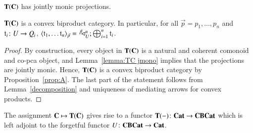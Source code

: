\begin{lemma}\label{lemma:TC jmono}
$\mathbf{T}(\mathbf{C})$ has jointly monic projections.
\end{lemma}
%
%
%

\begin{theorem}\label{thm:TCconvexbiproductcategory}
$\mathbf{T}(\mathbf{C})$ is a convex biproduct category. In particular, for all $\vec{p}=p_1,\dots ,p_n$ and $\mathfrak{t}_i\colon U \to Q_i$, $\langle \mathfrak{t}_1, \dots \mathfrak{t}_n\rangle_{\vec{p}} = ^{\;\;\vec{p}}\!\!\! \lhd_{U}^{n}; \bigoplus_{i=1}^n \mathfrak{t}_i$.
\end{theorem}
\begin{proof}
    By construction, every object in $\mathbf{T}(\mathbf{C})$ is a natural and coherent comonoid and co-pca object, and Lemma~\ref{lemma:TC jmono} implies that the projections are jointly monic. Hence, $\mathbf{T}(\mathbf{C})$ is a convex biproduct category by Proposition~\ref{prop:A}. The last part of the statement follows from Lemma~\ref{decomposition} and uniqueness of mediating arrows for convex products.
\end{proof}
The assignment $\mathbf{C} \mapsto \mathbf{T}(\mathbf{C})$ gives rise to a functor $\mathbf{T}(-)\colon \mathbf{Cat} \to \mathbf{CBCat}$ which is left adjoint to the forgetful functor  $U\colon \mathbf{CBCat} \to \mathbf{Cat} $.

